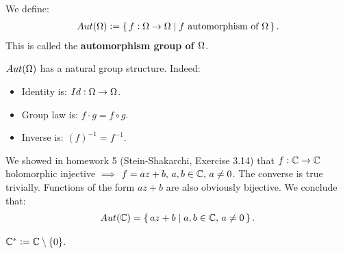 \begin{definition}
We define:
\begin{align*}
Aut(\Omega) \vcentcolon = \set{f:\Omega\to \Omega\mid f \text{ automorphism of } \Omega}.
\end{align*}
This is called the \textbf{automorphism group of $\Omega$}.
\end{definition}

\begin{note}
$Aut(\Omega)$ has a natural group structure. Indeed:
\begin{itemize}
    \item Identity is: $Id : \Omega \to \Omega$.
    \item Group law is: $f \cdot g = f \circ g$.
    \item Inverse is: $(f)^{-1} = f^{-1}$.
\end{itemize}

\end{note}

\begin{example}[$Aut(\C)$]

We showed in homework 5 (Stein-Shakarchi, Exercise 3.14) that $f: \mathbb{C} \to \mathbb{C} $ holomorphic injective $\implies$ $f = az+b, \, a,b \in \mathbb{C}, \, a \neq 0$. The converse is true trivially. Functions of the form $az+b$ are also obviously bijective. We conclude that:
\begin{align*}
    Aut(\mathbb{C}) = \set{az+b \mid a,b \in \mathbb{C}, \, a \neq 0}.
\end{align*}


\end{example}

\begin{notation}
$\mathbb{C}^* \vcentcolon= \mathbb{C} \setminus \{ 0 \} $.
\end{notation}


